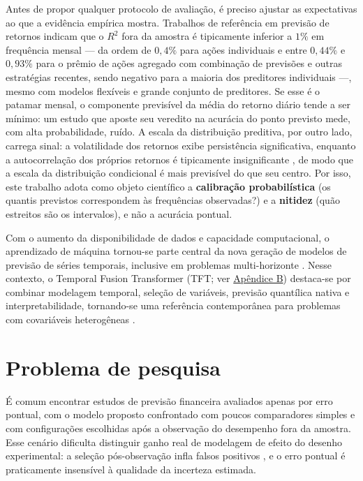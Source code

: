 Antes de propor qualquer protocolo de avaliação, é preciso ajustar as expectativas ao que a evidência empírica mostra. Trabalhos de referência em previsão de retornos indicam que o \(R^2\) fora da amostra é tipicamente inferior a \(1\%\) em frequência mensal --- da ordem de \(0{,}4\%\) para ações individuais \cite{GU2020} e entre \(0{,}44\%\) e \(0{,}93\%\) para o prêmio de ações agregado com combinação de previsões e outras estratégias recentes, sendo negativo para a maioria dos preditores individuais \cite{RAPACH2013} ---, mesmo com modelos flexíveis e grande conjunto de preditores. Se esse é o patamar mensal, o componente previsível da média do retorno diário tende a ser mínimo: um estudo que aposte seu veredito na acurácia do ponto previsto mede, com alta probabilidade, ruído. A escala da distribuição preditiva, por outro lado, carrega sinal: a volatilidade dos retornos exibe persistência significativa, enquanto a autocorrelação dos próprios retornos é tipicamente insignificante \cite{CONT2001}, de modo que a escala da distribuição condicional é mais previsível do que seu centro. Por isso, este trabalho adota como objeto científico a \textbf{calibração probabilística} (os quantis previstos correspondem às frequências observadas?) e a \textbf{nitidez} (quão estreitos são os intervalos), e não a acurácia pontual.

Com o aumento da disponibilidade de dados e capacidade computacional, o aprendizado de máquina tornou-se parte central da nova geração de modelos de previsão de séries temporais, inclusive em problemas multi-horizonte \cite{LIMZOHREN2021}. Nesse contexto, o Temporal Fusion Transformer (TFT; ver \hyperref[gl:tft]{Apêndice B}) destaca-se por combinar modelagem temporal, seleção de variáveis, previsão quantílica nativa e interpretabilidade, tornando-se uma referência contemporânea para problemas com covariáveis heterogêneas \cite{LIMETAL2021TFT}.

\section{Problema de pesquisa}
É comum encontrar estudos de previsão financeira avaliados apenas por erro pontual, com o modelo proposto confrontado com poucos comparadores simples e com configurações escolhidas após a observação do desempenho fora da amostra. Esse cenário dificulta distinguir ganho real de modelagem de efeito do desenho experimental: a seleção pós-observação infla falsos positivos \cite{WHITE2000,ROMANOWOLF2005}, e o erro pontual é praticamente insensível à qualidade da incerteza estimada.

